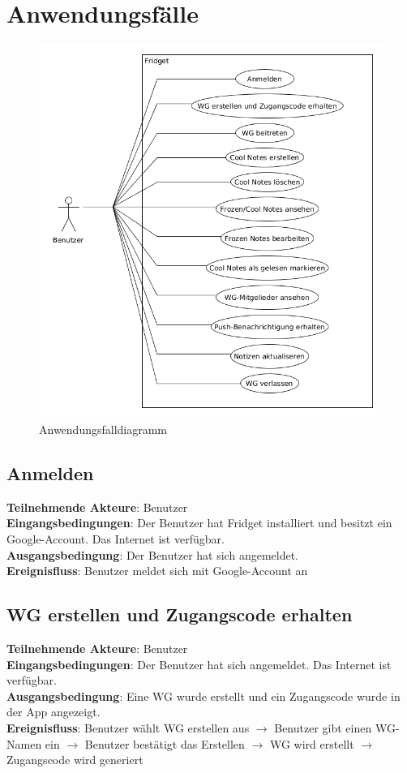 \documentclass[a4paper]{scrreprt}
\begin{document}
    \chapter{Anwendungsfälle}
    		\begin{figure}[H]
			\centering
			\includegraphics[scale = .6]{anwendungsfalldiagramm.png}
			\caption{Anwendungsfalldiagramm}
		\end{figure}
    		    		
        \section{Anmelden}
        \textbf{Teilnehmende Akteure}: Benutzer \\
		\textbf{Eingangsbedingungen}: Der Benutzer hat Fridget installiert und besitzt ein Google-Account. Das Internet ist verfügbar. \\
		\textbf{Ausgangsbedingung}: Der Benutzer hat sich angemeldet. \\
		\textbf{Ereignisfluss}: Benutzer meldet sich mit Google-Account an
		
		\section{WG erstellen und Zugangscode erhalten}
		\textbf{Teilnehmende Akteure}: Benutzer \\
		\textbf{Eingangsbedingungen}: Der Benutzer hat sich angemeldet. Das Internet ist verfügbar. \\
		\textbf{Ausgangsbedingung}: Eine WG wurde erstellt und ein Zugangscode wurde in der App angezeigt. \\
		\textbf{Ereignisfluss}: Benutzer wählt WG erstellen aus $\rightarrow$ Benutzer gibt einen WG-Namen ein $\rightarrow$ Benutzer bestätigt das Erstellen $\rightarrow$ WG wird erstellt $\rightarrow$ Zugangscode wird generiert
		
\end{document}

